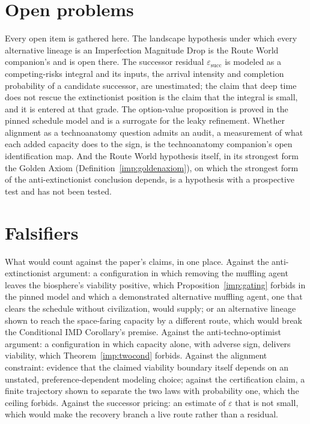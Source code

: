 \section{Open problems}\label{sec:open}

Every open item is gathered here. The landscape hypothesis under which
every alternative lineage is an Imperfection Magnitude Drop is the Route
World companion's and is open there. The successor residual
$\varepsilon_{\mathrm{succ}}$ is modeled as a competing-risks integral
and its inputs, the arrival intensity and completion probability of a
candidate successor, are unestimated; the claim that deep time does not
rescue the extinctionist position is the claim that the integral is
small, and it is entered at that grade. The option-value proposition is
proved in the pinned schedule model and is a surrogate for the leaky
refinement. Whether alignment as a technoanatomy question
admits an audit, a measurement of what each added capacity does to the
sign, is the technoanatomy companion's open identification map. And the
Route World hypothesis itself, in its strongest form the Golden Axiom
(Definition~\ref{imp:goldenaxiom}), on which the strongest form of the
anti-extinctionist conclusion depends, is a hypothesis with a
prospective test and has not been tested.

\section{Falsifiers}\label{sec:falsifiers}

What would count against the paper's claims, in one place. Against the
anti-extinctionist argument: a configuration in which removing the
muffling agent leaves the biosphere's viability positive, which
Proposition~\ref{imp:gating} forbids in the pinned model and which a
demonstrated alternative muffling agent, one that clears the schedule
without civilization, would supply; or an alternative lineage shown to
reach the space-faring capacity by a different route, which would break
the Conditional IMD Corollary's premise. Against the anti-techno-optimist
argument: a configuration in which capacity alone, with adverse sign,
delivers viability, which Theorem~\ref{imp:twocond} forbids. Against
the alignment constraint: evidence that the claimed viability boundary
itself depends on an unstated, preference-dependent modeling choice;
against the certification claim, a finite trajectory shown to separate the two laws
with probability one, which the ceiling forbids. Against the successor
pricing: an estimate of $\varepsilon$ that is not small, which would
make the recovery branch a live route rather than a residual.

